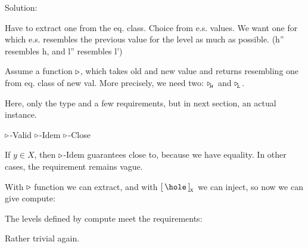 Solution:

Have to extract one from the eq. class. Choice from e.s. values. We want one for which e.s. resembles the previous value for the level as much as possible. (h'' resembles h, and l'' resembles l')

Assume a function $\triangleright$, which takes old and new value and returns resembling one from eq. class of new val. More precisely, we need two: $\triangleright_{_{\!\!H}}$ and $\triangleright_{_{\!\!L}}$. 


Here, only the type and a few requirements, but in next section, an actual instance.



			{$\triangleright$-Valid} 
	{$\triangleright$-Idem} 
		{$\triangleright$-Close} 

If $y \in X$, then {\sc $\triangleright$-Idem} guarantees close to, because we have equality. In other cases, the requirement remains vague.


With $\triangleright$ function we can extract, and with $\eqcl{\hole}{X}$ we can inject, so now we can give compute:


The levels defined by compute meet the requirements:


Rather trivial again.




